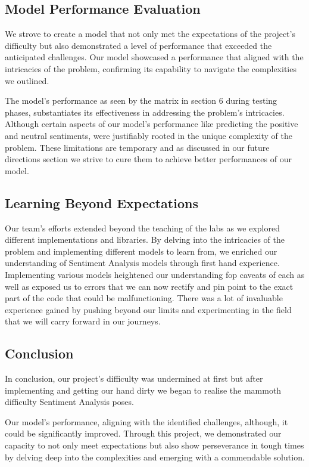 \subsection{Model Performance Evaluation}
\vspace{-1em}
We strove to create a model that not only met the expectations of the project's difficulty but also demonstrated a level of performance that exceeded the anticipated challenges. Our model showcased a performance that aligned with the intricacies of the problem, confirming its capability to navigate the complexities we outlined.

The model's performance as seen by the matrix in section 6 during testing phases, substantiates its effectiveness in addressing the problem's intricacies. Although certain aspects of our model's performance like predicting the positive and neutral sentiments, were justifiably rooted in the unique complexity of the problem. These limitations are temporary and as discussed in our future directions section we strive to cure them to achieve better performances of our model.
\vspace{-1em}
\subsection{Learning Beyond Expectations}
\vspace{-1em}
Our team's efforts extended beyond the teaching of the labs as we explored different implementations and libraries. By delving into the intricacies of the problem and implementing different models to learn from, we enriched our understanding of Sentiment Analysis models through first hand experience. Implementing various models heightened our understanding fop caveats of each as well as exposed us to errors that we can now rectify and pin point to the exact part of the code that could be malfunctioning. There was a lot of invaluable experience gained by pushing beyond our limits and experimenting in the field that we will carry forward in our journeys.
\vspace{-1em}
\subsection{Conclusion}
\vspace{-1em}
In conclusion, our project's difficulty was undermined at first but after implementing and getting our hand dirty we began to realise the mammoth difficulty Sentiment Analysis poses. 

Our model's performance, aligning with the identified challenges, although, it could be significantly improved. Through this project, we demonstrated our capacity to not only meet expectations but also show perseverance in tough times by delving deep into the complexities and emerging with a commendable solution.